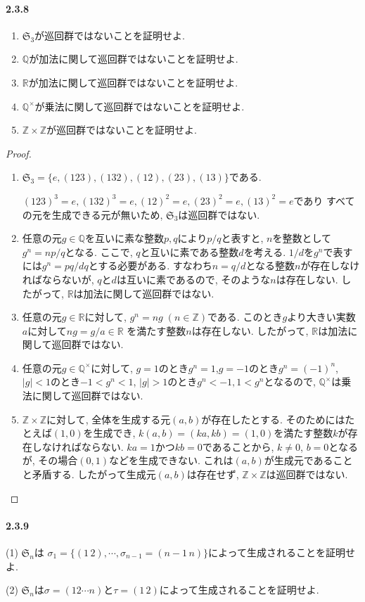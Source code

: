 \paragraph{2.3.8}
\begin{enumerate}
	\item $\mathfrak{S}_3$が巡回群ではないことを証明せよ.
	\item $\mathbb{Q}$が加法に関して巡回群ではないことを証明せよ.
	\item $\mathbb{R}$が加法に関して巡回群ではないことを証明せよ.
	\item $\mathbb{Q}^\times$が乗法に関して巡回群ではないことを証明せよ.
	\item $\mathbb{Z}\times\mathbb{Z}$が巡回群ではないことを証明せよ.
\end{enumerate}
\begin{proof}
  \begin{enumerate}
	\item $\mathfrak{S}_3=\{ e, (1 2 3), (1 3 2), (1 2), (2 3), (1 3)\}$である.
	
	$(1 2 3)^3=e, (1 3 2)^3=e, (12)^2=e, (23)^2=e, (13)^2=e$であり
	すべての元を生成できる元が無いため, $\mathfrak{S}_3$は巡回群ではない.
    
	\item 任意の元$g \in \mathbb{Q}$を互いに素な整数$p,q$により$p/q$と表すと,
	$n$を整数として$g^n=np/q$となる.
	ここで, $q$と互いに素である整数$d$を考える.
	$1/d$を$g^n$で表すには$g^n=pq/dq$とする必要がある.
	すなわち$n=q/d$となる整数$n$が存在しなければならないが,
	$q$と$d$は互いに素であるので, そのような$n$は存在しない.
	したがって, $\mathbb{R}$は加法に関して巡回群ではない.
    
	\item 任意の元$g \in \mathbb{R}$に対して,
	$g^n = ng \; (n \in \mathbb{Z})$である.
	このとき$g$より大きい実数$a$に対して$ng=g/a \in \mathbb{R}$
	を満たす整数$n$は存在しない.
	したがって, $\mathbb{R}$は加法に関して巡回群ではない.
    
	\item 任意の元$g \in \mathbb{Q}^\times$に対して,
	$g =1$のとき$g^n=1$,$g=-1$のとき$g^n=(-1)^n$,
	$|g|<1$のとき$-1<g^n<1$, $|g|>1$のとき$g^n<-1,1<g^n$となるので,
	$\mathbb{Q}^\times$は乗法に関して巡回群ではない.
    
	\item $\mathbb{Z}\times\mathbb{Z}$に対して,
    全体を生成する元$(a,b)$が存在したとする.
	そのためにはたとえば$(1,0)$を生成でき,
	$k(a,b)=(ka,kb)=(1,0)$を満たす整数$k$が存在しなければならない.
	$ka=1$かつ$kb=0$であることから, $k\neq 0$, $b=0$となるが,
	その場合$(0,1)$などを生成できない.
	これは$(a,b)$が生成元であることと矛盾する.
	したがって生成元$(a,b)$は存在せず,
	$\mathbb{Z}\times\mathbb{Z}$は巡回群ではない.
  \end{enumerate}

\end{proof}\leavevmode

\paragraph{2.3.9} (1) $\mathfrak{S}_n$は
$\sigma_1=\{(1\, 2),\cdots,\sigma_{n-1}=(n-1\,n)\}$によって生成されることを証明せよ.

(2) $\mathfrak{S}_n$は$\sigma=(1 2 \cdots n)$と$\tau=(1\,2)$によって生成されることを証明せよ.

